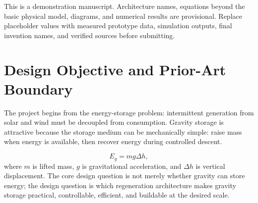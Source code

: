 \documentclass[10.5pt]{article}
\begin{document}
\begin{titlepage}
\vspace{2mm}
\begin{tcolorbox}[enhanced,colback=orange!6,colframe=orange,boxrule=0.75pt,arc=2pt,title={Important draft status},fonttitle=\bfseries]
This is a demonstration manuscript. Architecture names, equations beyond the basic physical model, diagrams, and numerical results are provisional. Replace placeholder values with measured prototype data, simulation outputs, final invention names, and verified sources before submitting.
\end{tcolorbox}

\vfill
\begin{center}
\end{center}
\end{titlepage}

\section{Design Objective and Prior-Art Boundary}
The project begins from the energy-storage problem: intermittent generation from solar and wind must be decoupled from consumption. Gravity storage is attractive because the storage medium can be mechanically simple: raise mass when energy is available, then recover energy during controlled descent.

\begin{equation}
E_g=m g \Delta h,
\label{eq:mgh}
\end{equation}
where $m$ is lifted mass, $g$ is gravitational acceleration, and $\Delta h$ is vertical displacement. The core design question is not merely whether gravity can store energy; the design question is which regeneration architecture makes gravity storage practical, controllable, efficient, and buildable at the desired scale.
\end{document}
